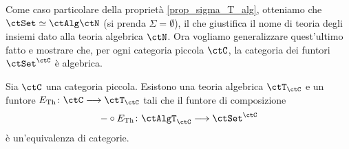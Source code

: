Come caso particolare della proprietà \ref{prop_sigma_T_alg}, otteniamo che \(\ctSet \simeq \ctAlg\ctN\) (si prenda \(\Sigma = \emptyset\)),
il che giustifica il nome di teoria degli insiemi dato alla teoria algebrica \(\ctN\). Ora vogliamo generalizzare quest'ultimo fatto e mostrare che,
per ogni categoria piccola \(\ctC\), la categoria dei funtori \(\ctSet^{\ctC}\) è algebrica.

\begin{proposition}\label{prop_compl_finprod}
 Sia \(\ctC\) una categoria piccola. Esistono una teoria algebrica \(\ctT_{\ctC}\) e un funtore
 \(E_{\mathrm{Th}} \colon \ctC \fun \ctT_{\ctC}\) tali che il funtore di composizione
 \[- \circ E_{\mathrm{Th}} \colon \ctAlgT_{\ctC} \fun \ctSet^{\ctC}\]
 è un'equivalenza di categorie.
\end{proposition}

